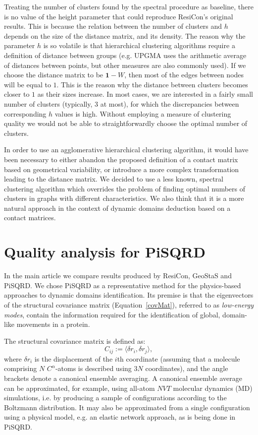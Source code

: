 \documentclass[a4paper,11pt,twoside]{book}%
\begin{document}
\begin{appendices}
Treating the number of clusters found by the spectral procedure as baseline, there is no value of the height parameter that could reproduce ResiCon's original results.
This is because the relation between the number of clusters and $h$ depends on the size of the distance matrix, and its density.
The reason why the parameter $h$ is so volatile is that hierarchical clustering algorithms require a definition of distance between groups (e.g. UPGMA uses the arithmetic average of distances between points, but other measures are also commonly used).
If we choose the distance matrix to be $\mathbf{1}-W$, then most of the edges between nodes will be equal to $1$.
This is the reason why the distance between clusters becomes closer to $1$ as their sizes increase.
In most cases, we are interested in a fairly small number of clusters (typically, $3$ at most), for which the discrepancies between corresponding $h$ values is high.
Without employing a measure of clustering quality we would not be able to straightforwardly choose the optimal number of clusters.

In order to use an agglomerative hierarchical clustering algorithm, it would have been necessary to either abandon the proposed definition of a contact matrix based on geometrical variability, or introduce a more complex transformation leading to the distance matrix.
We decided to use a less known, spectral clustering algorithm which overrides the problem of finding optimal numbers of clusters in graphs with different characteristics.
We also think that it is a more natural approach in the context of dynamic domains deduction based on a contact matrices.

\section{Quality analysis for PiSQRD}

In the main article we compare results produced by ResiCon, GeoStaS and PiSQRD.
We chose PiSQRD as a representative method for the physics-based approaches to dynamic domains identification.
Its premise is that the eigenvectors of the structural covariance matrix (Equation~\ref{covMat}), referred to as \emph{low-energy modes}, contain the information required for the identification of global, domain-like movements in a protein.

The structural covariance matrix is defined as:
\begin{equation}
 C_{ij}:=\langle \delta r_i, \delta r_j \rangle,
\label{covMat}
\end{equation}
where $\delta r_i$ is the displacement of the $i$th coordinate (assuming that a molecule comprising $N$ $C^\alpha$-atoms is described using $3N$ coordinates), and the angle brackets denote a canonical ensemble averaging.
A canonical ensemble average can be approximated, for example, using all-atom $NVT$ molecular dynamics (MD) simulations, i.e. by producing a sample of configurations according to the Boltzmann distribution.
It may also be approximated from a single configuration using a physical model, e.g. an elastic network approach, as is being done in PiSQRD.


\end{appendices}
\end{document}
